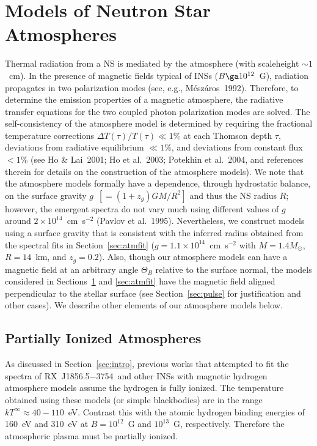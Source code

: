 \documentclass[useAMS,usegraphicx]{mn2e}
\newcommand{\etal}{et al.}
\newcommand{\rxjw}{RX~J1856.5$-$3754}
\newcommand{\zg}{z_g}
\newcommand{\ThetaB}{\ensuremath{\Theta_B}}
\newcommand{\tinfty}{\ensuremath{T^{\infty}}}
\begin{document}
\section{Models of Neutron Star Atmospheres}
\label{sec:atm}
Thermal radiation from a NS is mediated by the atmosphere
(with scaleheight $\sim 1$~cm).
In the presence of magnetic fields typical of INSs
($B\ga 10^{12}$~G), radiation propagates in two polarization modes
(see, e.g., M\'{e}sz\'{a}ros~1992).
Therefore, to determine the emission properties of a magnetic atmosphere,
the radiative transfer equations for the two coupled photon polarization
modes are solved.
The self-consistency of the atmosphere model is determined by requiring
the fractional temperature corrections $\Delta T(\tau)/T(\tau)\ll 1\%$
at each Thomson depth $\tau$, deviations from radiative
equilibrium $\ll 1\%$, and deviations from constant flux
$< 1\%$ (see Ho \& Lai~2001; Ho \etal~2003; Potekhin \etal~2004, and
references therein for details on the construction of the atmosphere models).
We note that the atmosphere models formally have a dependence, through
hydrostatic balance, on the surface gravity $g$~$[=(1+\zg)GM/R^2]$
and thus the NS radius $R$; however, the emergent spectra
do not vary much using different values of $g$ around
$2\times 10^{14}$~cm~s$^{-2}$ (Pavlov \etal~1995).
Nevertheless, we construct models using a surface gravity that is
consistent with the inferred radius obtained from the spectral fits
in Section~\ref{sec:atmfit}
($g=1.1\times 10^{14}$~cm~s$^{-2}$ with $M=1.4M_\odot$, $R=14$~km,
and $\zg=0.2$).
Also, though our atmosphere models can have a magnetic field at an
arbitrary angle $\ThetaB$ relative to the surface normal, the models
considered in Sections~\ref{sec:atm} and \ref{sec:atmfit} have the
magnetic field aligned perpendicular to the stellar surface
(see Section~\ref{sec:pulse} for justification and other cases).
We describe other elements of our atmosphere models below.

\subsection{Partially Ionized Atmospheres}
\label{sec:atm_pi}

As discussed in Section~\ref{sec:intro}, previous works that attempted
to fit the spectra of \rxjw\ and other INSs with magnetic hydrogen
atmosphere models assume the hydrogen is fully ionized.
The temperature obtained using these models (or simple
blackbodies) are in the range $k\tinfty\approx 40-110$~eV.
Contrast this with the atomic hydrogen binding energies of 160~eV and
310~eV at $B=10^{12}$~G and $10^{13}$~G, respectively.
Therefore the atmospheric plasma must be partially ionized.
\end{document}
